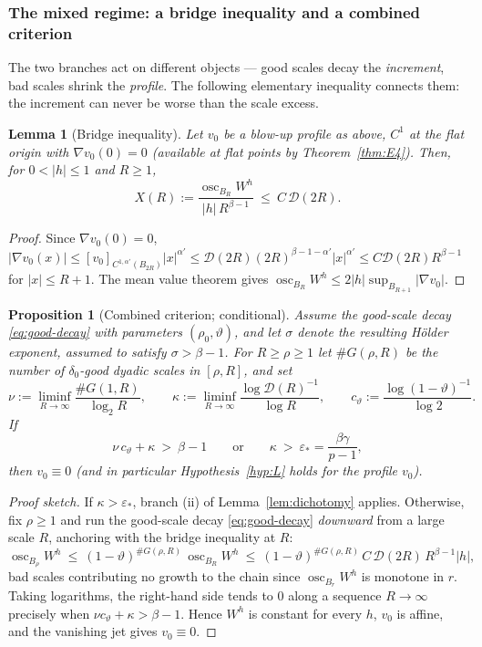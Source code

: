 \documentclass[11pt]{amsart}
\theoremstyle{plain}
\newtheorem{proposition}[theorem]{Proposition}
\newtheorem{lemma}[theorem]{Lemma}
\theoremstyle{definition}
\theoremstyle{remark}
\newcommand{\al}{\alpha}
\begin{document}
\subsubsection*{The mixed regime: a bridge inequality and a combined
criterion}
The two branches act on different objects --- good scales decay the
\emph{increment}, bad scales shrink the \emph{profile}. The following
elementary inequality connects them: the increment can never be worse than
the scale excess.

\begin{lemma}[Bridge inequality]\label{lem:bridge}
Let $v_0$ be a blow-up profile as above, $C^1$ at the flat origin with
$\nabla v_0(0)=0$ \textnormal{(}available at flat points by
Theorem~\ref{thm:E4}\textnormal{)}. Then, for $0<|h|\le1$ and $R\ge1$,
\[
  X(R):=\frac{\operatorname{osc}_{B_R}W^h}{|h|\,R^{\beta-1}}
  \ \le\ C\,\mathcal D(2R) .
\]
\end{lemma}
\begin{proof}
Since $\nabla v_0(0)=0$,
$|\nabla v_0(x)|\le[v_0]_{C^{1,\al'}(B_{2R})}|x|^{\al'}
\le\mathcal D(2R)(2R)^{\beta-1-\al'}|x|^{\al'}
\le C\mathcal D(2R)R^{\beta-1}$ for $|x|\le R+1$. The mean value theorem
gives $\operatorname{osc}_{B_R}W^h\le2|h|\sup_{B_{R+1}}|\nabla v_0|$.
\end{proof}

\begin{proposition}[Combined criterion; conditional]\label{prop:combined}
Assume the good-scale decay \eqref{eq:good-decay} with parameters
$(\rho_0,\vartheta)$, and let $\sigma$ denote the resulting H\"older
exponent, assumed to satisfy $\sigma>\beta-1$. For $R\ge\rho\ge1$ let
$\#G(\rho,R)$ be the number of $\delta_0$-good dyadic scales in
$[\rho,R]$, and set
\[
  \nu:=\liminf_{R\to\infty}\frac{\#G(1,R)}{\log_2R},
  \qquad
  \kappa:=\liminf_{R\to\infty}\frac{\log\mathcal D(R)^{-1}}{\log R},
  \qquad
  c_\vartheta:=\frac{\log(1-\vartheta)^{-1}}{\log2} .
\]
If
\begin{equation}\label{eq:window-out}
  \nu\,c_\vartheta+\kappa\ >\ \beta-1
  \qquad\text{or}\qquad
  \kappa\ >\ \varepsilon_*=\frac{\beta\gamma}{p-1},
\end{equation}
then $v_0\equiv0$ \textnormal{(}and in particular Hypothesis~\ref{hyp:L}
holds for the profile $v_0$\textnormal{)}.
\end{proposition}
\begin{proof}[Proof sketch]
If $\kappa>\varepsilon_*$, branch (ii) of Lemma~\ref{lem:dichotomy}
applies. Otherwise, fix $\rho\ge1$ and run the good-scale decay
\eqref{eq:good-decay} \emph{downward} from a large scale $R$, anchoring
with the bridge inequality at $R$:
\[
  \operatorname{osc}_{B_\rho}W^h
  \ \le\ (1-\vartheta)^{\#G(\rho,R)}\,\operatorname{osc}_{B_R}W^h
  \ \le\ (1-\vartheta)^{\#G(\rho,R)}\,C\,\mathcal D(2R)\,R^{\beta-1}|h| ,
\]
bad scales contributing no growth to the chain since
$\operatorname{osc}_{B_r}W^h$ is monotone in $r$. Taking logarithms, the
right-hand side tends to $0$ along a sequence $R\to\infty$ precisely when
$\nu c_\vartheta+\kappa>\beta-1$. Hence $W^h$ is constant for every $h$,
$v_0$ is affine, and the vanishing jet gives $v_0\equiv0$.
\end{proof}
\end{document}
